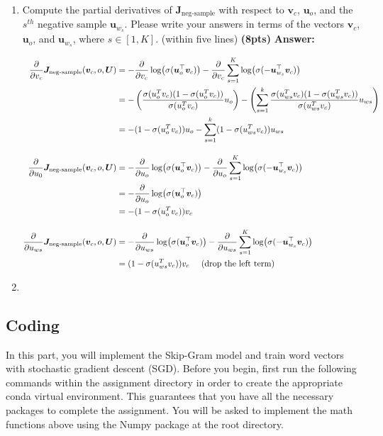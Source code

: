 \documentclass{assignment format}
\newenvironment{answer}{
    {\bf Answer:} \begingroup\color{red}
}{\endgroup}%
\begin{document}
\begin{enumerate}[label=(\alph*)]
\begin{answer}
    \end{answer}
\item Compute the partial derivatives of $\bm J_{\text{neg-sample}}$ with respect to $\bm v_c$, $\bm u_o$, and the $s^{th}$ negative sample $\bm u_{w_s}$. Please write your answers in terms of the vectors $\bm v_c$, $\bm u_o$, and $\bm u_{w_s}$, where $s \in [1, K]$.
 (within five lines)
\textbf{(8pts)}
\begin{answer}
\begin{align*}
    {\partial \over \partial v_c}\bm J_{\text{neg-sample}}(\bm v_c, o, \bm U) &= -{\partial \over \partial v_c}\log(\sigma(\bm u_o^\top \bm v_c)) - {\partial \over \partial v_c}\sum_{s=1}^K \log(\sigma(-\bm u_{w_s}^\top \bm v_c)) \\
    &= - \left(  { \sigma(u_o^T v_c)(1-\sigma(u_o^T v_c))\over \sigma(u_o^T v_c)} u_o\right) -\left(  \sum_{s=1}^k { \sigma(u_{ws}^T v_c)(1-\sigma(u_{ws}^T v_c))\over \sigma(u_{ws}^T v_c)} u_{ws}\right) \\
    &= -(1-\sigma(u_o^T v_c))u_o - \sum_{s=1}^k (1-\sigma(u_{ws}^T v_c))u_{ws} \\[10pt]
    {\partial \over \partial u_0}\bm J_{\text{neg-sample}}(\bm v_c, o, \bm U) &= -{\partial \over \partial u_o}\log(\sigma(\bm u_o^\top \bm v_c)) - {\partial \over \partial u_o}\sum_{s=1}^K \log(\sigma(-\bm u_{w_s}^\top \bm v_c)) \\
&=  -{\partial \over \partial u_o}\log(\sigma(\bm u_o^\top \bm v_c)) \\
&= -(1-\sigma(u_o^T v_c))v_c \\[10pt] 
{\partial \over \partial u_{ws}}\bm J_{\text{neg-sample}}(\bm v_c, o, \bm U) &= -{\partial \over \partial u_{ws}}\log(\sigma(\bm u_o^\top \bm v_c)) - {\partial \over \partial u_{ws}}\sum_{s=1}^K \log(\sigma(-\bm u_{w_s}^\top \bm v_c)) \\
&=  (1-\sigma(u_{ws}^T v_c))v_c  \;\;\;\;\; (\text{drop the left term})
\end{align*}
\item
    \end{answer}
\end{enumerate}
\subsection{Coding}
In this part, you will implement the Skip-Gram model and train word vectors with stochastic gradient descent (SGD). Before you begin, first run the following commands within the assignment directory in order to create the appropriate conda virtual environment. This guarantees that you have all the necessary packages to complete the assignment. You will be asked to implement the math functions above using the Numpy package at the root directory. 
\end{document}
